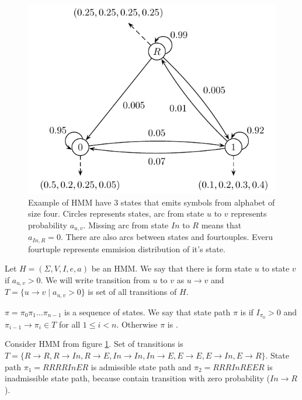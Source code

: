 \begin{figure}
\begin{center}
\includegraphics{../figures/exampleHMM.pdf}
\end{center}
\caption[Example of simple Hidden Markov Model]{
Example of HMM have $3$ states
that emits symbols from alphabet of size four.  Circles represents states, arc
from state $u$ to $v$ represents probability $a_{u,v}$. Missing arc from state
$In$ to $R$ means that $a_{In,R}=0$.  There are also arcs between states and
fourtouples. Everu fourtuple represents emmision distribution of it's state.
}\label{FIGURE:EXAMPLEHMM} 
\end{figure}


\begin{definition}\label{DEF:STATEPATH}
Let $H=(\Sigma,V,I,e,a)$ be an HMM. We say that there is 
form state $u$ to state $v$ if $a_{u,v}>0$. We will write transition from $u$ to
$v$ as $u\to v$ and $T=\{u\to v\mid a_{u,v}>0\}$ is set of all transitions of
$H$.

 $\pi=\pi_0\pi_1\dots\pi_{n-1}$ is a sequence of
states. We say that state path $\pi$ is  if $I_{\pi_0}>0$
and  $\pi_{i-1}\to\pi_i\in T$ for all $1\leq i < n$. Otherwise $\pi$ is
.
\end{definition}

\begin{example}
Consider HMM from figure \ref{FIGURE:EXAMPLEHMM}. Set of transitions is
$T=\{R\to R,R\to In, R\to E,In\to In, In\to E, E\to E, E\to In, E\to R\}$.
State path $\pi_1=RRRRInER$ is admissible state path and $\pi_2=RRRInREER$ is inadmissible
state path, because contain transition with zero probability ($In\to R$).
\end{example}

